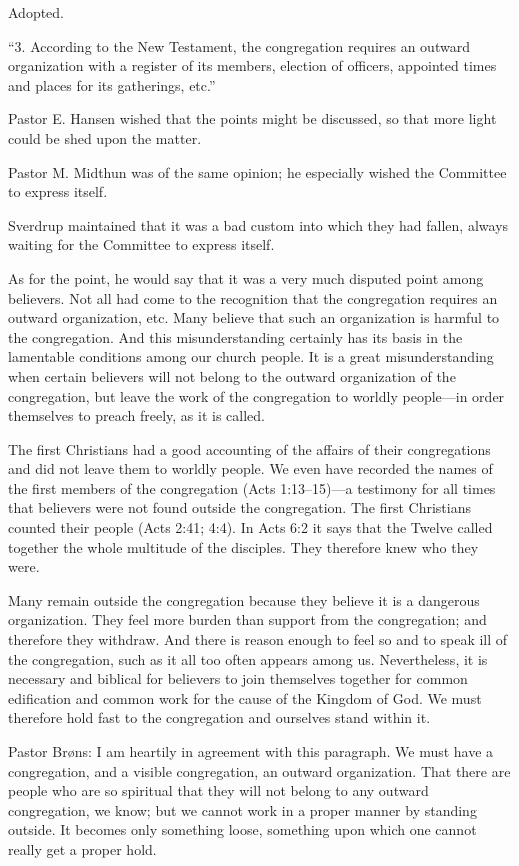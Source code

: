 Adopted.

“3. According to the New Testament, the congregation requires an outward organization with a register of its members, election of officers, appointed times and places for its gatherings, etc.”

Pastor E. Hansen wished that the points might be discussed, so that more light could be shed upon the matter.

Pastor M. Midthun was of the same opinion; he especially wished the Committee to express itself.

Sverdrup maintained that it was a bad custom into which they had fallen, always waiting for the Committee to express itself.

As for the point, he would say that it was a very much disputed point among believers. Not all had come to the recognition that the congregation requires an outward organization, etc. Many believe that such an organization is harmful to the congregation. And this misunderstanding certainly has its basis in the lamentable conditions among our church people. It is a great misunderstanding when certain believers will not belong to the outward organization of the congregation, but leave the work of the congregation to worldly people—in order themselves to preach freely, as it is called.

The first Christians had a good accounting of the affairs of their congregations and did not leave them to worldly people. We even have recorded the names of the first members of the congregation (Acts 1:13–15)—a testimony for all times that believers were not found outside the congregation. The first Christians counted their people (Acts 2:41; 4:4). In Acts 6:2 it says that the Twelve called together the whole multitude of the disciples. They therefore knew who they were.

Many remain outside the congregation because they believe it is a dangerous organization. They feel more burden than support from the congregation; and therefore they withdraw. And there is reason enough to feel so and to speak ill of the congregation, such as it all too often appears among us. Nevertheless, it is necessary and biblical for believers to join themselves together for common edification and common work for the cause of the Kingdom of God. We must therefore hold fast to the congregation and ourselves stand within it.

Pastor Brøns: I am heartily in agreement with this paragraph. We must have a congregation, and a visible congregation, an outward organization. That there are people who are so spiritual that they will not belong to any outward congregation, we know; but we cannot work in a proper manner by standing outside. It becomes only something loose, something upon which one cannot really get a proper hold.

